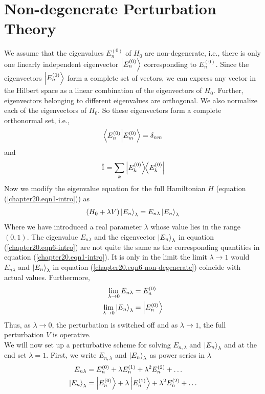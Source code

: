 \section{Non-degenerate Perturbation Theory}
We assume that the eigenvalues $E_n^{(0)}$ of $H_0$ are non-degenerate, i.e., there is only one linearly independent eigenvector $\ket{E_n^{(0)}}$ corresponding to $E_n^{(0)}$. Since the eigenvectors $\ket{E_n^{(0)}}$ form a complete set of vectors, we can express any vector in the Hilbert space as a linear combination of the eigenvectors of $H_0$. Further, eigenvectors belonging to different eigenvalues are orthogonal. We also normalize each of the eigenvectors of $H_0$. So these eigenvectors form a complete orthonormal set, i.e.,
\begin{equation}
	\braket{E_n^{(0)}}{E_m^{(0)}} = \delta_{n m}
	\label{chapter20.eqn4-non-degenerate}
\end{equation}
and
\begin{equation}
	\hat{1} = \sum_{k} \ketbra{E_k^{(0)}}{E_k^{(0)}}
	\label{chapter20.eqn5-non-degenerate}
\end{equation}
Now we modify the eigenvalue equation for the full Hamiltonian $H$ (equation (\ref{chapter20.eqn1-intro})) as
\begin{equation}
	(H_0 + \lambda V) \ket{E_n}_\lambda = E_{n\lambda} \ket{E_n}_\lambda
	\label{chapter20.eqn6-non-degenerate}
\end{equation}
Where we have introduced a real parameter $\lambda$ whose value lies in the range $(0,1)$. The eigenvalue $E_{n \lambda}$ and the eigenvector $\ket{E_n}_\lambda$  in equation (\ref{chapter20.eqn6-intro}) are not quite the same as the corresponding quantities in equation (\ref{chapter20.eqn1-intro}). It is only in the limit the limit $\lambda\rightarrow 1$ would $E_{n\lambda}$ and  $\ket{E_n}_\lambda$ in equation (\ref{chapter20.eqn6-non-degenerate}) coincide with actual values. Furthermore,
\begin{align}
	\lim\limits_{\lambda \rightarrow 0} E_{n \lambda} &= E_n^{(0)} \\
	\lim\limits_{\lambda \rightarrow 0} \ket{E_n}_\lambda &= \ket{E_{n}^{(0)}}
\end{align}
Thus, as $\lambda \rightarrow 0$, the perturbation is switched off and as $\lambda \rightarrow 1$, the full perturbation $V$ is operative.\\

We will now set up a perturbative scheme for solving $E_{n,\lambda}$ and $\ket{E_n}_\lambda$ and at the end set $\lambda = 1$. First, we write $E_{n,\lambda}$ and $\ket{E_n}_\lambda$ as power series in $\lambda$
\begin{align}
\label{chapter20.eqn7-non-degenerate}
E_{n\lambda} &= E_n^{(0)} + \lambda E_n^{(1)} + \lambda^2 E_n^{(2)} + \ldots \\
\label{chapter20.eqn8-non-degenerate}
\ket{E_n}_\lambda &= \ket{E_n^{(0)}} + \lambda \ket{E_n^{(1)}} + \lambda^2 E_n^{(2)} + \ldots
\end{align}

